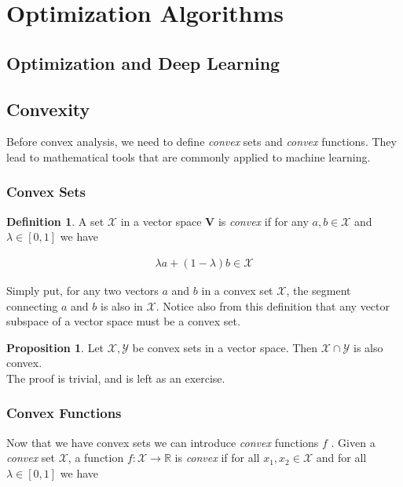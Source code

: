 \documentclass[a4paper,12pt]{article}
\theoremstyle{definition}
\newtheorem*{definition}{Definition}
\newtheorem*{proposition}{Proposition}
\begin{document}
\section{Optimization Algorithms}

\subsection{Optimization and Deep Learning}

\subsection{Convexity}
Before convex analysis, we need to define \emph{convex} sets and \emph{convex} functions. They lead to mathematical tools that are commonly applied to machine learning.

\subsubsection*{Convex Sets}
\begin{definition}
    A set $\mathcal{X}$ in a vector space $\mathbf{V}$ is \emph{convex} if for any $a,b \in \mathcal{X}$ and $\lambda \in [0, 1]$ we have

    \begin{align*}
        \lambda  a + (1-\lambda)  b \in \mathcal{X}
    \end{align*}

\end{definition}

Simply put, for any two vectors $a$ and $b$ in a convex set $\mathcal{X}$, the segment connecting $a$ and $b$ is also in $\mathcal{X}$.
Notice also from this definition that any vector subspace of a vector space must be a convex set.

\begin{proposition}
    Let $\mathcal{X}, \mathcal{Y}$ be convex sets in a vector space. Then $\mathcal{X} \cap \mathcal{Y}$ is also convex.
    \\[6pt]
    The proof is trivial, and is left as an exercise.
\end{proposition}


\subsubsection*{Convex Functions}

Now that we have convex sets we can introduce \emph{convex} functions $f$ . Given a \emph{convex} set $\mathcal{X}$, a function $f: \mathcal{X} \to \mathbb{R}$ is \emph{convex} if for all
$x_1, x_2 \in \mathcal{X}$ and for all $\lambda \in [0, 1]$ we have
\end{document}
